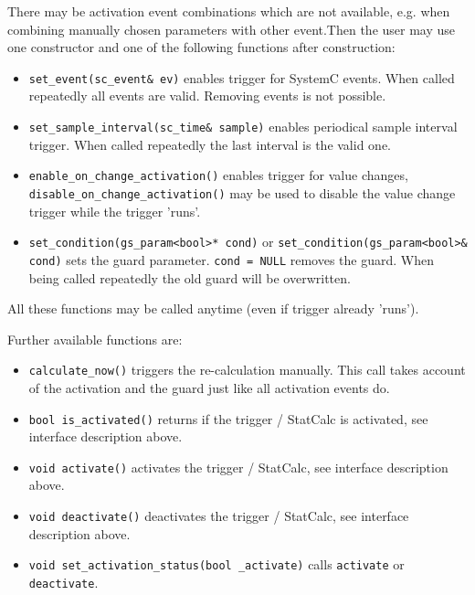 There may be activation event combinations which are not available, e.g. when combining manually chosen parameters with other event.Then the user may use one constructor and one of the following functions after construction: 
\begin{itemize}
  \item \lstinline|set_event(sc_event& ev)| enables trigger for SystemC events.  \vspace{.5em} \newline
    When called repeatedly all events are valid. Removing events is not possible.
  \item \lstinline|set_sample_interval(sc_time& sample)| enables periodical sample interval trigger.  \vspace{.5em} \newline
    When called repeatedly the last interval is the valid one.
  \item \lstinline|enable_on_change_activation()| enables trigger for value changes,  \vspace{.5em} \newline
    \lstinline|disable_on_change_activation()| may be used to disable the value change trigger while the trigger 'runs'.
  \item \lstinline[language=TeX]|set_condition(gs_param<bool>* cond)| or \lstinline[language=TeX]|set_condition(gs_param<bool>& cond)| sets the guard parameter.   \vspace{.5em} \newline
    \lstinline|cond = NULL| removes the guard. \newline
    When being called repeatedly the old guard will be overwritten.
\end{itemize}
All these functions may be called anytime (even if trigger already 'runs').
 
Further available functions are:
\begin{itemize}   
  \item \lstinline|calculate_now()| triggers the re-calculation manually. This call takes account of the activation and the guard just like all activation events do. 
  \item \lstinline[language=TeX]|bool is_activated()| returns if the trigger / StatCalc is activated, see interface description above.
  \item \lstinline[language=TeX]|void activate()| activates the trigger / StatCalc, see interface description above.
  \item \lstinline[language=TeX]|void deactivate()| deactivates the trigger / StatCalc, see interface description above.
  \item \lstinline[language=TeX]|void set_activation_status(bool _activate)| calls \lstinline|activate| or \lstinline|deactivate|.
\end{itemize}

